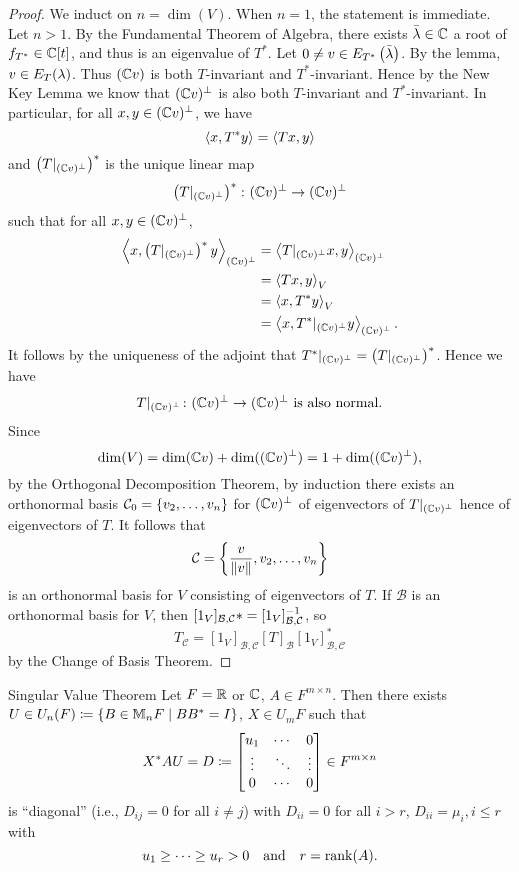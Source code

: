 \documentclass[class=article, crop=false]{standalone}
\begin{document}
  \begin{proof}
    We induct on $n = \dim(V)$. When $n = 1$, the statement is immediate. Let $n > 1$. By the Fundamental Theorem of Algebra, there exists $\bar{\lambda}\in \mathbb{C}$ a root of $f_{T^*}\in \mathbb{C}[t]$, and thus is an eigenvalue of $T^*$. Let $0\neq v\in E_{T^*}\left( \bar{\lambda} \right)$. By the lemma, $v\in E_T(\lambda)$. Thus $(\mathbb{C} v)$ is both $T$-invariant and $T^*$-invariant. Hence by the New Key Lemma we know that $(\mathbb{C} v)^\perp$ is also both $T$-invariant and $T^*$-invariant. In particular, for all $x, y\in (\mathbb{C} v)^\perp$, we have
    \[
      \left\langle x, T^*y \right\rangle = \left\langle Tx, y \right\rangle
    \]
    and $\left( T|_{(\mathbb{C} v)^\perp} \right)^*$ is the unique linear map 
    \[
      \left( T|_{(\mathbb{C} v)^\perp} \right)^*\colon (\mathbb{C} v)^\perp\to (\mathbb{C} v)^\perp
    \]
    such that for all $x, y\in (\mathbb{C} v)^\perp$,
    \begin{align*}
      \left\langle x, \left( T|_{(\mathbb{C} v)^\perp} \right)^*y \right\rangle_{(\mathbb{C} v)^\perp} &= \left\langle T|_{(\mathbb{C} v)^\perp}x, y \right\rangle_{(\mathbb{C} v)^\perp} \\
                                                                 &= \left\langle Tx, y \right\rangle_V \\
                                                                 &= \left\langle x, T^*y \right\rangle_V \\
                                                                 &= \left\langle x, T^*|_{(\mathbb{C} v)^\perp}y \right\rangle_{(\mathbb{C} v)^\perp}.
    \end{align*}
    It follows by the uniqueness of the adjoint that $T^*|_{(\mathbb{C} v)^\perp} = \left( T|_{(\mathbb{C} v)^\perp} \right)^*$. Hence we have
    \[
      T|_{(\mathbb{C} v)^\perp}\colon (\mathbb{C} v)^\perp\to (\mathbb{C} v)^\perp \text{ is also normal.}
    \]
    Since
    \[
      \dim(V) = \dim(\mathbb{C} v) + \dim((\mathbb{C} v)^\perp) = 1 + \dim((\mathbb{C} v)^\perp),
    \]
    by the Orthogonal Decomposition Theorem, by induction there exists an orthonormal basis $\mathcal{C}_0 = \left\{v_2,\dotsc,v_n\right\}$ for $(\mathbb{C} v)^\perp$ of eigenvectors of $T|_{(\mathbb{C} v)^\perp}$ hence of eigenvectors of $T$. It follows that
    \[
      \mathcal{C} = \left\{\frac{v}{\left\lVert v\right\rVert}, v_2,\dotsc,v_n\right\}
    \]
    is an orthonormal basis for $V$ consisting of eigenvectors of $T$. If $\mathcal{B}$ is an orthonormal basis for $V$, then $[1_V]_{\mathcal{B},\mathcal{C}}* = [1_V]_{\mathcal{B},\mathcal{C}}^{-1}$, so
    \[
      T_{\mathcal{C}} = [1_V]_{\mathcal{B},\mathcal{C}}[T]_{\mathcal{B}}[1_V]_{\mathcal{B},\mathcal{C}}^*
    \]
    by the Change of Basis Theorem.
  \end{proof}
  \newpage
  \begin{theorem}{Singular Value Theorem}
    Let $F = \mathbb{R}$ or $\mathbb{C}$, $A\in F^{m\times n}$. Then there exists $U\in U_n(F)\coloneqq \left\{B\in \mathbb{M}_nF\mid BB^* = I\right\}$, $X\in U_mF$ such that
    \[
      X^*AU = D\coloneqq \begin{bmatrix}u_1 & \cdots & 0 \\\vdots & \ddots & \vdots\\ 0 & \cdots & 0\end{bmatrix}\in F^{m\times n}
    \]
    is ``diagonal'' (i.e., $D_{ij} = 0$ for all $i\neq j$) with $D_{ii} = 0$ for all $i > r$, $D_{ii} = \mu_i, i\leq r$ with
    \[
      u_1\geq \dotsb \geq u_r > 0 \quad \text{and}\quad r = \operatorname{rank}(A).
    \]
  \end{theorem}
\end{document}
